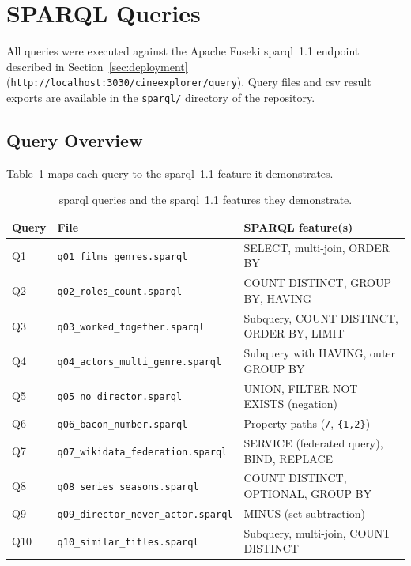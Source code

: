 \section{SPARQL Queries}
\label{sec:sparql}

All queries were executed against the Apache Fuseki \ac{sparql}~1.1 endpoint described in Section~\ref{sec:deployment} (\texttt{http://localhost:3030/cineexplorer/query}). Query files and \ac{csv} result exports are available in the \texttt{sparql/} directory of the repository.

\subsection{Query Overview}

Table~\ref{tab:sparql-overview} maps each query to the \ac{sparql}~1.1 feature it demonstrates.

\begin{table}[H]
\centering
\small
\begin{tabular}{llp{6cm}}
\hline
\textbf{Query} & \textbf{File} & \textbf{SPARQL feature(s)} \\
\hline
Q1  & \texttt{q01\_films\_genres.sparql}          & SELECT, multi-join, ORDER BY \\
Q2  & \texttt{q02\_roles\_count.sparql}           & COUNT DISTINCT, GROUP BY, HAVING \\
Q3  & \texttt{q03\_worked\_together.sparql}       & Subquery, COUNT DISTINCT, ORDER BY, LIMIT \\
Q4  & \texttt{q04\_actors\_multi\_genre.sparql}   & Subquery with HAVING, outer GROUP BY \\
Q5  & \texttt{q05\_no\_director.sparql}           & UNION, FILTER NOT EXISTS (negation) \\
Q6  & \texttt{q06\_bacon\_number.sparql}          & Property paths (\texttt{/}, \texttt{\{1,2\}}) \\
Q7  & \texttt{q07\_wikidata\_federation.sparql}   & SERVICE (federated query), BIND, REPLACE \\
Q8  & \texttt{q08\_series\_seasons.sparql}        & COUNT DISTINCT, OPTIONAL, GROUP BY \\
Q9  & \texttt{q09\_director\_never\_actor.sparql} & MINUS (set subtraction) \\
Q10 & \texttt{q10\_similar\_titles.sparql}        & Subquery, multi-join, COUNT DISTINCT \\
\hline
\end{tabular}
\caption{\ac{sparql} queries and the \ac{sparql}~1.1 features they demonstrate.}
\label{tab:sparql-overview}
\end{table}

